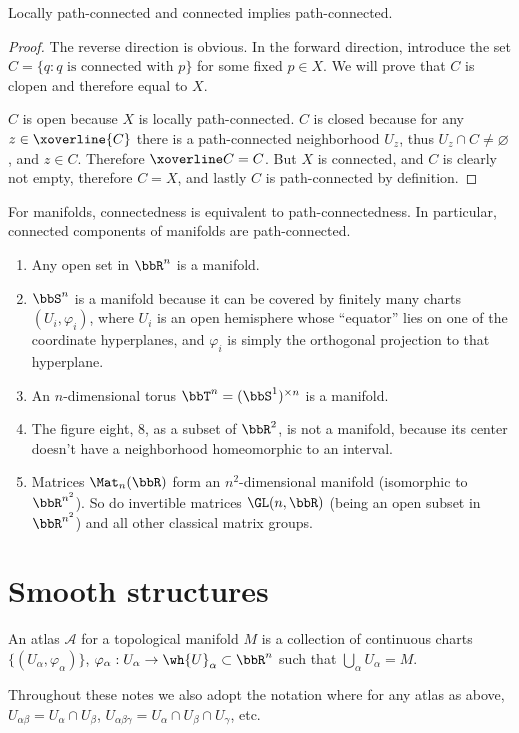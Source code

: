 \begin{lem}
    Locally path-connected and connected implies path-connected.
\end{lem}
\begin{proof}
    The reverse direction is obvious. In the forward direction, introduce the set $C=\{q:q\text{ is connected with }p\}$  for some fixed $p\in X$. We will prove that $C$ is clopen and therefore equal to $X$.

    $C$ is open because $X$ is locally path-connected.
    $C$ is closed because for any $z\in\xoverline{C}$ there is a path-connected neighborhood $U_z$, thus $U_z\cap C\neq \varnothing$, and $z\in C$. Therefore $\xoverline C=C$. 
    But $X$ is connected, and $C$ is clearly not empty, therefore $C=X$, and lastly $C$ is path-connected by definition.
\end{proof}
\begin{cor}
    For manifolds, connectedness is equivalent to path-connectedness. In particular, connected components of manifolds are path-connected.
\end{cor}

\begin{example}
\begin{enumerate}
    \item Any open set in $\bbR^n$ is a manifold.
    \item $\bbS^n$ is a manifold because it can be covered by finitely many charts $(U_i,\varphi_i)$, where $U_i$ is an open hemisphere whose ``equator'' lies on one of the coordinate hyperplanes, and $\varphi_i$ is simply the orthogonal projection to that hyperplane.
    \item An $n$-dimensional torus $\bbT^n=(\bbS^1)^{\times n}$ is a manifold.
    \item The figure eight, 8, as a subset of $\bbR^2$, is not a manifold, because its center doesn't have a neighborhood homeomorphic to an interval.
    \item Matrices $\Mat_n(\bbR)$ form an $n^2$-dimensional manifold (isomorphic to $\bbR^{n^2}$). So do invertible matrices $\GL(n,\bbR )$ (being an open subset in $\bbR^{n^2}$) and all other classical matrix groups.
\end{enumerate}
\end{example}

\section{Smooth structures}
\begin{defn}[Atlas]
    An atlas $\mathcal{A}$ for a topological manifold $M$ is a collection of continuous charts $\{(U_\alpha,\varphi_\alpha)\}$, $\varphi_\alpha:U_\alpha\to \wh{U}_\alpha \subset \bbR^n$ such that $\bigcup_\alpha U_\alpha =M$.
\end{defn}
Throughout these notes we also adopt the notation where for any atlas as above, $U_{\alpha\beta}=U_\alpha \cap U_\beta$, $U_{\alpha\beta\gamma}=U_\alpha \cap U_\beta \cap U_\gamma$, etc.

